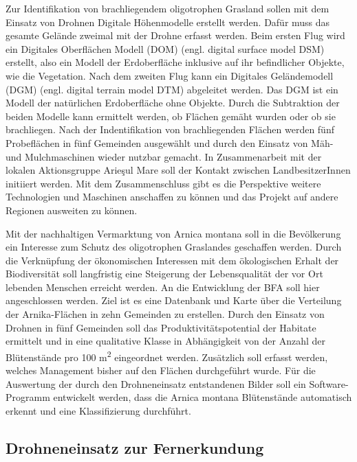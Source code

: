 Zur Identifikation von brachliegendem oligotrophen Grasland sollen mit dem Einsatz von Drohnen Digitale Höhenmodelle erstellt werden. Dafür muss das gesamte Gelände zweimal mit der Drohne erfasst werden. Beim ersten Flug wird ein Digitales Oberflächen Modell (DOM) (engl. digital surface model DSM) erstellt, also ein Modell der Erdoberfläche inklusive auf ihr befindlicher Objekte, wie die Vegetation. Nach dem zweiten Flug kann ein Digitales Geländemodell (DGM) (engl. digital terrain model DTM) abgeleitet werden. Das DGM ist ein Modell der natürlichen Erdoberfläche ohne Objekte. Durch die Subtraktion der beiden Modelle kann ermittelt werden, ob Flächen gemäht wurden oder ob sie brachliegen. Nach der Indentifikation von brachliegenden Flächen werden fünf Probeflächen in fünf Gemeinden ausgewählt und durch den Einsatz von Mäh- und Mulchmaschinen wieder nutzbar gemacht. In Zusammenarbeit mit der lokalen Aktionsgruppe Arieşul Mare soll der Kontakt zwischen LandbesitzerInnen initiiert werden. Mit dem Zusammenschluss gibt es die Perspektive weitere Technologien und Maschinen anschaffen zu können und das Projekt auf andere Regionen ausweiten zu können.

Mit der nachhaltigen Vermarktung von Arnica montana soll in die Bevölkerung ein Interesse zum Schutz des oligotrophen Graslandes geschaffen werden. Durch die Verknüpfung der ökonomischen Interessen mit dem ökologischen Erhalt der Biodiversität soll langfristig eine Steigerung der Lebensqualität der vor Ort lebenden Menschen erreicht werden. An die Entwicklung der BFA soll hier angeschlossen werden. Ziel ist es eine Datenbank und Karte über die Verteilung der Arnika-Flächen in zehn Gemeinden zu erstellen. Durch den Einsatz von Drohnen in fünf Gemeinden soll das Produktivitätspotential der Habitate ermittelt und in eine qualitative Klasse in Abhängigkeit von der Anzahl der Blütenstände pro 100 m\textsuperscript{2} eingeordnet werden. Zusätzlich soll erfasst werden, welches Management bisher auf den Flächen durchgeführt wurde. Für die Auswertung der durch den Drohneneinsatz entstandenen Bilder soll ein Software-Programm entwickelt werden, dass die Arnica montana Blütenstände automatisch erkennt und eine Klassifizierung durchführt.

\subsection{Drohneneinsatz zur Fernerkundung}

